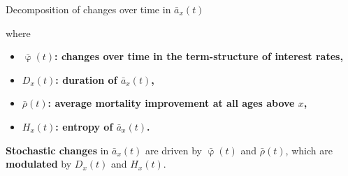 \documentclass[10pt]{beamer}
\begin{document}
\begin{frame}{Decomposition of changes over time in $\bar{a}_x(t)$}

\begin{center}
	\pause
\end{center}

where

\begin{itemize}

	\item $\bar{\upvarphi}(t)$\textbf{: changes over time in the term-structure of interest rates,} \pause
	\item ${D}_x(t)$\textbf{: duration of $\bar{a}_x(t)$,}	\pause
	\item $\bar{\rho}(t)$\textbf{: average mortality improvement at all ages above $x$,} \pause
	\item ${H}_x(t)$\textbf{: entropy of $\bar{a}_x(t)$.} \pause
\end{itemize}


\textbf{Stochastic changes} in $\bar{a}_x(t)$ are driven by $\bar{\upvarphi}(t)$ and $\bar{\rho}(t)$, which are \textbf{modulated} by  ${D}_x(t)$ and ${H}_x(t)$.
\end{frame}
\end{document}

